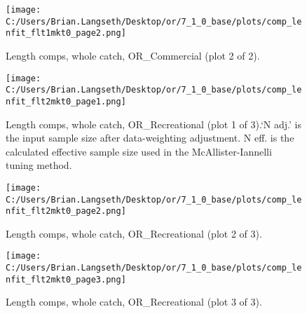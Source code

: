 \documentclass[11pt,
  english,
  a4paper,
]{article}
\begin{document}
\tagmcend\tagstructend


\begin{figure}
\centering
\texttt{[image: C:/Users/Brian.Langseth/Desktop/or/7\_1\_0\_base/plots/comp\_lenfit\_flt1mkt0\_page2.png]}
\caption{Length comps, whole catch, OR\_Commercial (plot 2 of 2).\label{fig:comp_lenfit_flt1mkt0_page2}}
\end{figure}

\tagmcend\tagstructend


\begin{figure}
\centering
\texttt{[image: C:/Users/Brian.Langseth/Desktop/or/7\_1\_0\_base/plots/comp\_lenfit\_flt2mkt0\_page1.png]}
\caption{Length comps, whole catch, OR\_Recreational (plot 1 of 3).`N adj.' is the input sample size after data-weighting adjustment. N eff. is the calculated effective sample size used in the McAllister-Iannelli tuning method.\label{fig:comp_lenfit_flt2mkt0_page1}}
\end{figure}

\tagmcend\tagstructend


\begin{figure}
\centering
\texttt{[image: C:/Users/Brian.Langseth/Desktop/or/7\_1\_0\_base/plots/comp\_lenfit\_flt2mkt0\_page2.png]}
\caption{Length comps, whole catch, OR\_Recreational (plot 2 of 3).\label{fig:comp_lenfit_flt2mkt0_page2}}
\end{figure}

\tagmcend\tagstructend


\begin{figure}
\centering
\texttt{[image: C:/Users/Brian.Langseth/Desktop/or/7\_1\_0\_base/plots/comp\_lenfit\_flt2mkt0\_page3.png]}
\caption{Length comps, whole catch, OR\_Recreational (plot 3 of 3).\label{fig:comp_lenfit_flt2mkt0_page3}}
\end{figure}
\end{document}
